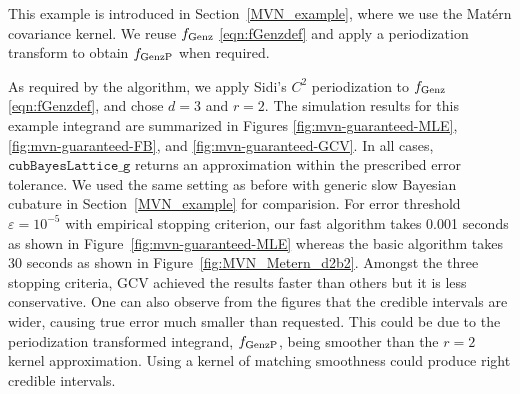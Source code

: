 \documentclass{iitthesis}          %
\newcommand{\hmu}{\widehat{\mu}}
\newcommand{\code}[1]{\texttt{#1}}
\def\abs#1{\ensuremath{\left \lvert #1 \right \rvert}}
\newcommand\figref{Figure~\ref}
\newcommand\secref{Section~\ref}
\begin{document}


This example is introduced in Section~\ref{MVN_example}, where we use the Mat\'ern covariance kernel.  We reuse $f_{\textup{Genz}}$ \eqref{eqn:fGenzdef} and apply a periodization transform to obtain $f_{\textup{GenzP}}$ when required.

\Subsection{Using \code{cubBayesLattice\_g}}
As required by the algorithm, we apply Sidi's $C^2$  periodization to $ f_{\textup{Genz}}$ \eqref{eqn:fGenzdef}, and chose $d=3$ and $r=2$. The simulation results for this example integrand  are summarized in Figures \ref{fig:mvn-guaranteed-MLE}, \ref{fig:mvn-guaranteed-FB}, and \ref{fig:mvn-guaranteed-GCV}.  In all cases, $\code{cubBayesLattice\_g}$ returns an approximation within the prescribed error tolerance. We used the same setting as before with generic slow Bayesian cubature in \secref{MVN_example} for comparision. For error threshold $\varepsilon=10^{-5}$ with empirical stopping criterion, our fast algorithm takes 0.001 seconds as shown in \figref{fig:mvn-guaranteed-MLE} whereas the basic algorithm takes 30 seconds as shown in \figref{fig:MVN_Metern_d2b2}. 
Amongst the three stopping criteria, GCV achieved the results faster than others but it is less conservative. 
One can also observe from the figures that the credible intervals are wider, causing true error much smaller than requested.
This could be due to the periodization transformed integrand, $f_\textup{GenzP}$, being smoother than the $r=2$ kernel approximation. Using a kernel of matching smoothness could produce right credible intervals.
\end{document}
